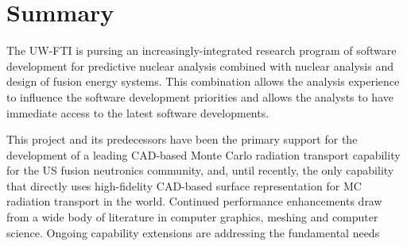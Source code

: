 \section{Summary}

The \gls{UW-FTI} is pursing an increasingly-integrated research program of
software development for predictive nuclear analysis combined with nuclear
analysis and design of fusion energy systems.  This combination allows the
analysis experience to influence the software development priorities and
allows the analysts to have immediate access to the latest software
developments.

This project and its predecessors have been the primary support for the
development of a leading CAD-based Monte Carlo radiation transport capability
for the US fusion neutronics community, and, until recently\cite{talamo_serpent_2018},
the only capability that directly uses high-fidelity CAD-based surface
representation for MC radiation transport in the world.  Continued performance
enhancements draw from a wide body of literature in computer graphics, meshing
and computer science.  Ongoing capability extensions are addressing the
fundamental needs
